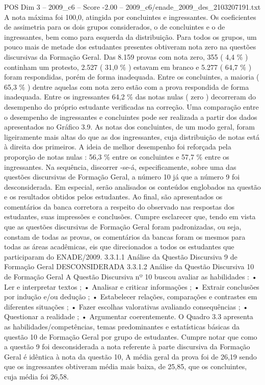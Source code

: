 \begin{textsample}{POS Dim 3 – 2009\_c6 – Score -2.00 – 2009\_c6/enade\_2009\_des\_2103207191.txt}
A nota máxima foi 100,0, atingida por concluintes e ingressantes.
Os coeficientes de assimetria para os dois grupos considerados, o de concluintes e o de ingressantes, bem como para esquerda da distribuição.
Para todos os grupos, um pouco mais de metade dos estudantes presentes obtiveram nota zero na questões discursivas da Formação Geral.
Das 8.159 provas com nota zero, 355 ( 4,4 \% ) continham um protesto, 2.527 ( 31,0 \% ) estavam em branco e 5.277 ( 64,7 \% ) foram respondidas, porém de forma inadequada.
Entre os concluintes, a maioria ( 65,3 \% ) dentre aquelas com nota zero estão com a prova respondida de forma inadequada.
Entre os ingressantes 64,2 \% das notas nulas ( zero ) decorreram do desempenho do próprio estudante verificadas na correção.
Uma comparação entre o desempenho de ingressantes e concluintes pode ser realizada a partir dos dados apresentados no Gráfico 3.9.
As notas dos concluintes, de um modo geral, foram ligeiramente mais altas do que as dos ingressantes, cuja distribuição de notas está à direita dos primeiros.
A ideia de melhor desempenho foi reforçada pela proporção de notas nulas : 56,3 \% entre os concluintes e 57,7 \% entre os ingressantes.
Na sequência, discorrer -se-á, especificamente, sobre uma das questões discursivas de Formação Geral, a número 10 já que a número 9 foi desconsiderada.
Em especial, serão analisados os conteúdos englobados na questão e os resultados obtidos pelos estudantes.
Ao final, são apresentados os comentários da banca corretora a respeito do observado nas respostas dos estudantes, suas impressões e conclusões.
Cumpre esclarecer que, tendo em vista que as questões discursivas de Formação Geral foram padronizadas, ou seja, constam de todas as provas, os comentários da bancas foram os mesmos para todas as áreas acadêmicas, eis que direcionados a todos os estudantes que participaram do ENADE/2009. 3.3.1.1 Análise da Questão Discursiva 9 de Formação Geral DESCONSIDERADA 3.3.1.2 Análise da Questão Discursiva 10 de Formação Geral A Questão Discursiva nº 10 buscou avaliar as habilidades : • Ler e interpretar textos ; • Analisar e criticar informações ; • Extrair conclusões por indução e/ou dedução ; • Estabelecer relações, comparações e contrastes em diferentes situações ; • Fazer escolhas valorativas avaliando consequências ; • Questionar a realidade ; • Argumentar coerentemente.
O Quadro 3.3 apresenta as habilidades/competências, temas predominantes e estatísticas básicas da questão 10 de Formação Geral por grupo de estudantes.
Cumpre notar que como a questão 9 foi desconsiderada a nota referente à parte discursiva da Formação Geral é idêntica à nota da questão 10, A média geral da prova foi de 26,19 sendo que os ingressantes obtiveram média mais baixa, de 25,85, que os concluintes, cuja média foi 26,58.

\end{textsample}
